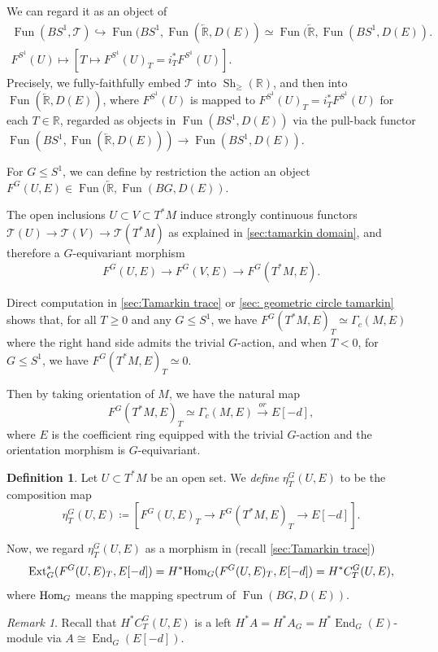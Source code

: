 \documentclass[11pt]{amsart}
\numberwithin{equation}{section}
\theoremstyle{plain}
\theoremstyle{definition}
\newtheorem{Def}[def]{Definition}
\theoremstyle{remark}
\newtheorem{RMK}[rmk]{Remark}
\newcommand{\bR} { {\mathbb{R}}}
\newcommand{\sT} { {\mathscr{T}}}
\newcommand{\HOM}{{ \textnormal{Hom}  }}
\newcommand{\Sh} { {\operatorname{Sh}}}
\newcommand\End{\operatorname{End}}
\newcommand\Fun{\operatorname{Fun}}
\newcommand\Ext{\operatorname{Ext}}
\newcommand{\larbR} { \overleftarrow{\mathbb{R}}}
\begin{document}
We can regard it as an object of 
    \begin{gather*}
 \Fun(BS^1,\sT) \hookrightarrow \Fun(BS^1,\Fun(\larbR,D(E))\simeq \Fun(\larbR,\Fun(BS^1,D(E)) .\\
F^{S^1}(U) \mapsto [T\mapsto F^{S^1}(U)_{T}=i_T^*F^{S^1}(U)].       
    \end{gather*}
Precisely, we fully-faithfully embed $\sT$ into $\Sh_{\geq}(\bR)$, and then into $\Fun(\larbR,D(E))$, where $F^{S^1}(U)$ is mapped to $F^{S^1}(U)_{T}=i_T^*F^{S^1}(U)$ for each $T \in \bR$, regarded as objects in $\Fun(BS^1, D(E))$  via the pull-back functor $\Fun(BS^1, \Fun(\larbR,D(E))) \to \Fun(BS^1, D(E))$.

For $G\leq S^1$, we can define by restriction the action an object $F^{G}(U,E)\in\Fun(\larbR,\Fun(BG,D(E))$.

 

The open inclusions $U \subset V \subset T^*M$ induce strongly continuous functors $\sT(U) \rightarrow \sT(V) \rightarrow \sT(T^*M)$ as explained in \autoref{sec:tamarkin domain}, and therefore a $G$-equivariant morphism 
\[F^G(U,E) \rightarrow F^G(V,E) \rightarrow F^G(T^*M,E).\] 


Direct computation in \autoref{sec:Tamarkin trace} or \autoref{sec: geometric circle tamarkin} shows that, for all $T\geq 0$ and any $G\leq S^1$, we have $F^G(T^*M,E)_{T} \simeq \Gamma_c(M,E)$ where the right hand side admits the trivial $G$-action, and when $T<0$, for $G \leq S^1$, we have $F^G(T^*M,E)_{T}\simeq 0$. 

Then by taking orientation of $M$, we have the natural map 
\[F^G(T^*M,E)_{T} \simeq \Gamma_c(M,E) \xrightarrow{or} E[-d],\]
where $E$ is the coefficient ring equipped with the trivial $G$-action and the orientation morphism is $G$-equivariant. 



\begin{Def}\label{definition: fundamental class}
Let $U \subset T^*M$ be an open set. We \emph{define} $\eta^G_T(U,E)$ to be the composition map
\[\eta^G_T(U,E) \coloneqq \left[F^G(U,E)_{T} \rightarrow F^G(T^*M,E)_{T}\rightarrow E[-d]\right] .\]
\end{Def}

Now, we regard $\eta^G_T(U,E)$ as a morphism in (recall \autoref{sec:Tamarkin trace})
\[\Ext^*_{G}(F^G(U,E)_{T},E[-d])=H^*\HOM_{G}(F^G(U,E)_{T},E[-d])=H^*C^{G}_T(U,E),\] where $\HOM_{G}$ means the mapping spectrum of $\Fun(BG,D(E))$. 

\begin{RMK}Recall that $H^*C^{G}_T(U,E)$ is a left  $H^*A=H^*A_G=H^*\End_G(E)$-module via $A\cong  \End_G(E[-d])$.


\end{RMK}
 
\end{document}
